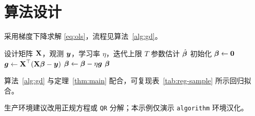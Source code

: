 \section{算法设计}

采用梯度下降求解 \eqref{eq:ols}，流程见算法~\cref{alg:gd}。

\begin{algorithm}[H]
  \caption{批量梯度下降（示例）}\label{alg:gd}
  \begin{algorithmic}[1]
    \Require 设计矩阵 $\boldsymbol{\mathrm{X}}$，观测 $\boldsymbol{y}$，学习率 $\eta$，迭代上限 $T$
    \Ensure 参数估计 $\hat{\boldsymbol{\beta}}$
    \State 初始化 $\boldsymbol{\beta}\gets \boldsymbol{0}$
      \State $\boldsymbol{g}\gets \boldsymbol{\mathrm{X}}^\top(\boldsymbol{\mathrm{X}}\boldsymbol{\beta}-\boldsymbol{y})$
      \State $\boldsymbol{\beta}\gets \boldsymbol{\beta}-\eta\boldsymbol{g}$
    \EndFor
    \State \Return $\boldsymbol{\beta}$
  \end{algorithmic}
\end{algorithm}

算法~\cref{alg:gd} 与定理~\cref{thm:main} 配合，可复现表~\cref{tab:reg-sample} 所示回归拟合。

\begin{remark}[实现提示]
生产环境建议改用正规方程或 \texttt{QR} 分解；本示例仅演示 \texttt{algorithm} 环境汉化。
\end{remark}
